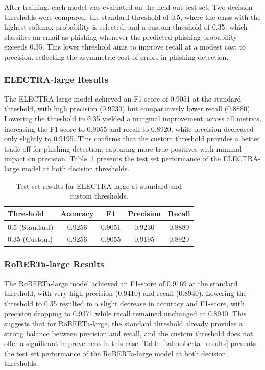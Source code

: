 After training, each model was evaluated on the held-out test set. Two decision thresholds were compared: the standard threshold of 0.5, where the class with the highest softmax probability is selected, and a custom threshold of 0.35, which classifies an email as phishing whenever the predicted phishing probability exceeds 0.35. This lower threshold aims to improve recall at a modest cost to precision, reflecting the asymmetric cost of errors in phishing detection.

\subsubsection{ELECTRA-large Results}

The \acs{ELECTRA}-large model achieved an F1-score of 0.9051 at the standard threshold, with high precision (0.9230) but comparatively lower recall (0.8880). Lowering the threshold to 0.35 yielded a marginal improvement across all metrics, increasing the F1-score to 0.9055 and recall to 0.8920, while precision decreased only slightly to 0.9195. This confirms that the custom threshold provides a better trade-off for phishing detection, capturing more true positives with minimal impact on precision. Table~\ref{tab:electra_results} presents the test set performance of the \acs{ELECTRA}-large model at both decision thresholds.

\begin{table}[htbp]
\centering
\caption{Test set results for \acs{ELECTRA}-large at standard and custom thresholds.}
\label{tab:electra_results}
\begin{tabular}{lcccc}
\hline
\textbf{Threshold} & \textbf{Accuracy} & \textbf{F1} & \textbf{Precision} & \textbf{Recall} \\
\hline
0.5 (Standard) & 0.9256 & 0.9051 & 0.9230 & 0.8880 \\
0.35 (Custom)  & 0.9256 & 0.9055 & 0.9195 & 0.8920 \\
\hline
\end{tabular}
\end{table}

\subsubsection{RoBERTa-large Results}

The \acs{RoBERTa}-large model achieved an F1-score of 0.9169 at the standard threshold, with very high precision (0.9410) and recall (0.8940). Lowering the threshold to 0.35 resulted in a slight decrease in accuracy and F1-score, with precision dropping to 0.9371 while recall remained unchanged at 0.8940. This suggests that for \acs{RoBERTa}-large, the standard threshold already provides a strong balance between precision and recall, and the custom threshold does not offer a significant improvement in this case. Table~\ref{tab:roberta_results} presents the test set performance of the \acs{RoBERTa}-large model at both decision thresholds.

